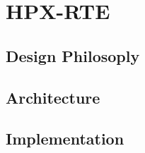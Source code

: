 \chapter{HPX-RTE}
\label{sec:HPX-RTE}

\section{Design Philosoply}
\label{sec:design}

\section{Architecture}
\label{sec:architecture}

\section{Implementation}
\label{sec:implementation}
